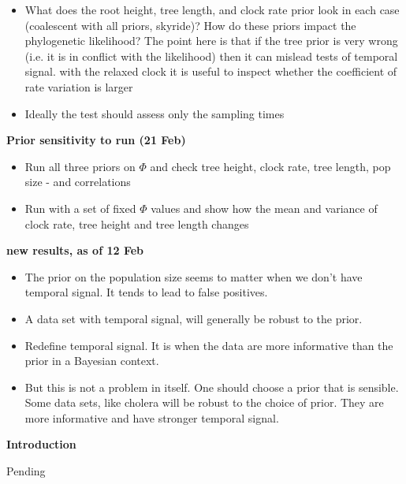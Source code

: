 \documentclass[11pt]{article}
\begin{document}
\begin{itemize}
	\item What does the root height, tree length, and clock rate prior look in each case (coalescent with all priors, skyride)?
	\subitem How do these priors impact the phylogenetic likelihood? The point here is that if the tree prior is very wrong (i.e. it is in conflict with the likelihood) then it can mislead tests of temporal signal.
	\subitem with the relaxed clock it is useful to inspect whether the coefficient of rate variation is larger
	\item Ideally the test should assess only the sampling times
	
\end{itemize}



\textbf{Prior sensitivity to run (21 Feb)}
\begin{itemize}
	\item Run all three priors on $\Phi$ and check
	\subitem tree height, clock rate, tree length, pop size - and correlations
	\item Run with a set of fixed $\Phi$ values and show how the mean and variance of clock rate, tree height and tree length changes 
\end{itemize}

\textbf{new results, as of 12 Feb}
\begin{itemize}
	\item The prior on the population size seems to matter when we don't have temporal signal. It tends to lead to false positives. 
	\item A data set with temporal signal, will generally be robust to the prior. 
	\item Redefine temporal signal. It is when the data are more informative than the prior in a Bayesian context.
	\item But this is not a problem in itself. One should choose a prior that is sensible. Some data sets, like cholera will be robust to the choice of prior. They are more informative and have stronger temporal signal. 
\end{itemize}





\begin{Large}
	\textbf{Introduction}
\end{Large}

Pending
\end{document}
